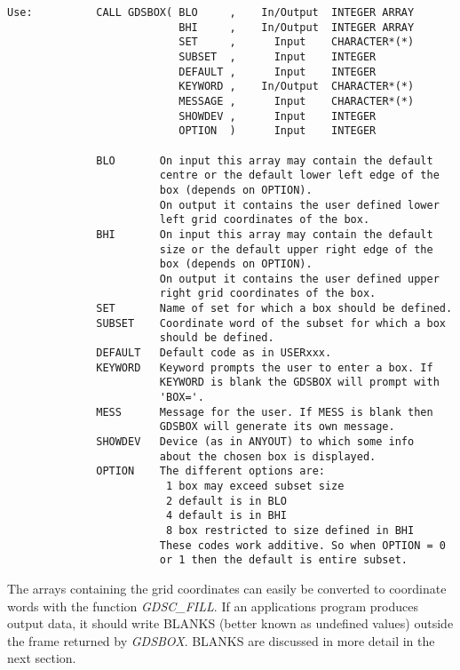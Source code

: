 \begin{verbatim}
Use:          CALL GDSBOX( BLO     ,    In/Output  INTEGER ARRAY
                           BHI     ,    In/Output  INTEGER ARRAY
                           SET     ,      Input    CHARACTER*(*)
                           SUBSET  ,      Input    INTEGER
                           DEFAULT ,      Input    INTEGER
                           KEYWORD ,    In/Output  CHARACTER*(*)
                           MESSAGE ,      Input    CHARACTER*(*)
                           SHOWDEV ,      Input    INTEGER
                           OPTION  )      Input    INTEGER

              BLO       On input this array may contain the default
                        centre or the default lower left edge of the
                        box (depends on OPTION).
                        On output it contains the user defined lower
                        left grid coordinates of the box.
              BHI       On input this array may contain the default
                        size or the default upper right edge of the
                        box (depends on OPTION).
                        On output it contains the user defined upper
                        right grid coordinates of the box.
              SET       Name of set for which a box should be defined.
              SUBSET    Coordinate word of the subset for which a box
                        should be defined.
              DEFAULT   Default code as in USERxxx.
              KEYWORD   Keyword prompts the user to enter a box. If
                        KEYWORD is blank the GDSBOX will prompt with
                        'BOX='.
              MESS      Message for the user. If MESS is blank then
                        GDSBOX will generate its own message.
              SHOWDEV   Device (as in ANYOUT) to which some info
                        about the chosen box is displayed.
              OPTION    The different options are:
                         1 box may exceed subset size
                         2 default is in BLO
                         4 default is in BHI
                         8 box restricted to size defined in BHI
                        These codes work additive. So when OPTION = 0
                        or 1 then the default is entire subset.
\end{verbatim}

\noindent The arrays containing the grid coordinates can easily be
converted to coordinate words with the function {\sl GDSC\_FILL\/}.  If
an applications program produces output data, it should write BLANKS
(better known as undefined values) outside the frame returned by {\sl
GDSBOX\/}.  BLANKS are discussed in more detail in the next section.

